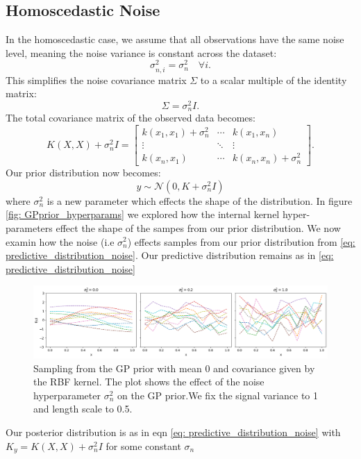 \documentclass{ucdgradtaughtthesis}
\begin{document}
\subsection{Homoscedastic Noise} 

In the homoscedastic case, we assume that all observations have the same noise level, meaning the noise variance is constant across the dataset:
\[
\sigma_{n,i}^2 = \sigma_n^2 \quad \forall i.
\]
This simplifies the noise covariance matrix \( \Sigma \) to a scalar multiple of the identity matrix:
\[
\Sigma = \sigma_n^2 I.
\]
The total covariance matrix of the observed data becomes:
\[
K(X, X) + \sigma_n^2 I = 
\begin{bmatrix}
k(x_1, x_1) + \sigma_n^2 & \cdots & k(x_1, x_n) \\
\vdots & \ddots & \vdots \\
k(x_n, x_1) & \cdots & k(x_n, x_n) + \sigma_n^2
\end{bmatrix}.
\]
Our prior distribution now becomes:
\begin{equation}
y \sim \mathcal{N}(0, K+\sigma_n^2 I)
\label{eq: prior_withnoise}
\end{equation}
where $\sigma_n^2$ is a new parameter which effects the shape of the distribution. In figure \ref{fig: GPprior_hyperparams} we 
explored how the internal kernel hyper-parameters effect the shape of the sampes from our prior distribution. We now examin how the noise (i.e $\sigma_n^2$) effects samples from our prior distribution from \ref{eq:  predictive_distribution_noise}.
Our predictive distribution remains as in \ref{eq: predictive_distribution_noise}

\begin{figure}[H]
    \centering
        \includegraphics[width=\textwidth]{LatexPlots/1dplots/Kernel_noise.png}
        \caption[Visualising the effect of noise on samples from the GP prior.]{Sampling from the GP prior with mean 0 and covariance given by the RBF kernel.
        The plot shows the effect of the noise hyperparameter \(\sigma_n^2\) on the GP prior.We fix the signal variance to 1 and length scale to 0.5.}
    \label{fig: kernel_noise}
\end{figure}
\noindent
Our posterior distribution is as in eqn \ref{eq:  predictive_distribution_noise} with \(K_y = K(X, X) + \sigma_n^2 I \) for some constant \(\sigma_n\)
\end{document}

